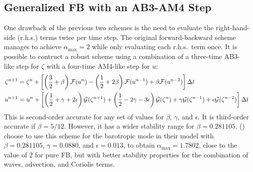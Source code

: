 \subsection{Generalized FB with an AB3-AM4 Step}
One drawback of the previous two schemes is the need to evaluate the
right-hand-side (r.h.s.) terms twice per time step. The original
forward-backward scheme manages to achieve $\alpha_{\max}
= 2$ while only evaluating each r.h.s.\ term once. It is possible to
contruct a robust scheme using a combination of a three-time
AB3-like step for $\zeta$ with a four-time AM4-like step for $u$:
\begin{equation}\begin{split}
   \zeta^{n+1} &= \zeta^n + \left[ \left( \frac{3}{2}+\beta \right)
   {\cal F}(u^n) - \left( \frac{1}{2}+ 2\beta \right) {\cal F}(u^{n-1}) +
   \beta {\cal F}(u^{n-2}) \right] \Delta t \\
   u^{n+1} &= u^n + \left[ \left( \frac{1}{2}+\gamma + 2\epsilon \right)
   {\cal G}(\zeta^{n+1}) +
   \left( \frac{1}{2}-2\gamma-3\epsilon \right){\cal G}(\zeta^n) +
   \gamma {\cal G}(\zeta^{n-1}) + \epsilon  {\cal G}(\zeta^{n-2}) \right]
   \Delta t
\end{split}\end{equation}
This is second-order accurate for any set of values for $\beta$,
$\gamma$, and $\epsilon$. It is third-order accurate if $\beta =
5/12$. However, it has a wider stability range for $\beta =
0.281105$. (\cite{SS2008b}) choose to use
this scheme for the barotropic mode in their model with $\beta=
0.281105$, $\gamma = 0.0880$, and $\epsilon = 0.013$, to obtain
$\alpha_{\max} = 1.7802$, close to the value of 2 for
pure FB, but with better stability properties for the combination of
waves, advection, and Coriolis terms.
